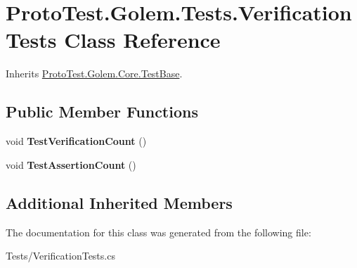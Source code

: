 \hypertarget{class_proto_test_1_1_golem_1_1_tests_1_1_verification_tests}{\section{Proto\-Test.\-Golem.\-Tests.\-Verification\-Tests Class Reference}
\label{class_proto_test_1_1_golem_1_1_tests_1_1_verification_tests}
}


Inherits \hyperlink{class_proto_test_1_1_golem_1_1_core_1_1_test_base}{Proto\-Test.\-Golem.\-Core.\-Test\-Base}.

\subsection*{Public Member Functions}
\begin{DoxyCompactItemize}
\item 
\hypertarget{class_proto_test_1_1_golem_1_1_tests_1_1_verification_tests_a9356d690f88e4fb1d4dfc9139d7bfb13}{void {\bfseries Test\-Verification\-Count} ()}\label{class_proto_test_1_1_golem_1_1_tests_1_1_verification_tests_a9356d690f88e4fb1d4dfc9139d7bfb13}

\item 
\hypertarget{class_proto_test_1_1_golem_1_1_tests_1_1_verification_tests_a03d6bbf346de7e2f5b35042340410e21}{void {\bfseries Test\-Assertion\-Count} ()}\label{class_proto_test_1_1_golem_1_1_tests_1_1_verification_tests_a03d6bbf346de7e2f5b35042340410e21}

\end{DoxyCompactItemize}
\subsection*{Additional Inherited Members}


The documentation for this class was generated from the following file\-:\begin{DoxyCompactItemize}
\item 
Tests/Verification\-Tests.\-cs\end{DoxyCompactItemize}
